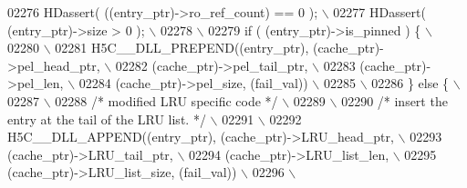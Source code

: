 \begin{DoxyCode}
02276 \textcolor{preprocessor}{    HDassert( ((entry\_ptr)->ro\_ref\_count) == 0 );                          \(\backslash\)}
02277 \textcolor{preprocessor}{    HDassert( (entry\_ptr)->size > 0 );                                     \(\backslash\)}
02278 \textcolor{preprocessor}{                                                                           \(\backslash\)}
02279 \textcolor{preprocessor}{    if ( (entry\_ptr)->is\_pinned ) \{                                        \(\backslash\)}
02280 \textcolor{preprocessor}{                                                                           \(\backslash\)}
02281 \textcolor{preprocessor}{        H5C\_\_DLL\_PREPEND((entry\_ptr), (cache\_ptr)->pel\_head\_ptr,           \(\backslash\)}
02282 \textcolor{preprocessor}{                         (cache\_ptr)->pel\_tail\_ptr,                        \(\backslash\)}
02283 \textcolor{preprocessor}{                         (cache\_ptr)->pel\_len,                             \(\backslash\)}
02284 \textcolor{preprocessor}{                         (cache\_ptr)->pel\_size, (fail\_val))                \(\backslash\)}
02285 \textcolor{preprocessor}{                                                                           \(\backslash\)}
02286 \textcolor{preprocessor}{    \} else \{                                                               \(\backslash\)}
02287 \textcolor{preprocessor}{                                                                           \(\backslash\)}
02288 \textcolor{preprocessor}{        }\textcolor{comment}{/* modified LRU specific code */}\textcolor{preprocessor}{                                   \(\backslash\)}
02289 \textcolor{preprocessor}{                                                                           \(\backslash\)}
02290 \textcolor{preprocessor}{        }\textcolor{comment}{/* insert the entry at the tail of the LRU list. */}\textcolor{preprocessor}{                \(\backslash\)}
02291 \textcolor{preprocessor}{                                                                           \(\backslash\)}
02292 \textcolor{preprocessor}{        H5C\_\_DLL\_APPEND((entry\_ptr), (cache\_ptr)->LRU\_head\_ptr,            \(\backslash\)}
02293 \textcolor{preprocessor}{                        (cache\_ptr)->LRU\_tail\_ptr,                         \(\backslash\)}
02294 \textcolor{preprocessor}{                (cache\_ptr)->LRU\_list\_len,                         \(\backslash\)}
02295 \textcolor{preprocessor}{                        (cache\_ptr)->LRU\_list\_size, (fail\_val))            \(\backslash\)}
02296 \textcolor{preprocessor}{                                                                           \(\backslash\)}

\end{DoxyCode}
